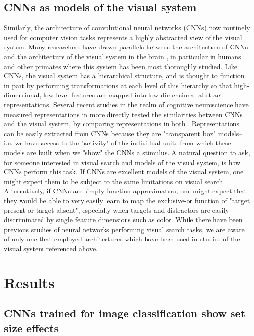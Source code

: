 \documentclass[10pt,letterpaper]{article}
\begin{document}
\subsection{CNNs as models of the visual system}
Similarly, the architecture of convolutional neural networks (CNNs) now routinely used for
computer vision tasks represents a highly abstracted view of the visual system.
Many researchers have drawn parallels between the architecture of CNNs and the 
architecture of the visual system in the brain \cite{kriegeskorteDeepNeuralNetworks2015}, 
in particular in humans and other primates where this system has been most thoroughly 
studied. Like CNNs, the visual system has a hierarchical structure, and is thought to 
function in part by performing transformations at each level of this hierarchy so that 
high-dimensional, low-level features are mapped into low-dimensional abstract 
representations. Several recent studies in the realm of cognitive neuroscience 
have measured representations in more directly tested the similarities between CNNs and 
the visual system, by comparing representations in both 
\cite{khaligh-razaviDeepSupervisedNot2014, yaminsUsingGoaldrivenDeep2016, yaminsPerformanceoptimizedHierarchicalModels2014}. Representations 
can be easily extracted from CNNs because they are "transparent box" models--i.e. we have 
access to the "activity" of the individual units from which these models are built when 
we "show" the CNNs a stimulus.
A natural question to ask, for someone interested in visual search and models of the visual 
system, is how CNNs perform this task. If CNNs are excellent models of the visual system, 
one might expect them to be subject to the same limitations on visual search. Alternatively, 
if CNNs are simply function approximators, one might expect that they would be able to 
very easily learn to map the exclusive-or function of "target present or target absent", 
especially when targets and distractors are easily discriminated by single feature 
dimensions such as color. While there have been previous studies of neural networks 
performing visual search tasks, we are aware of only one that employed architectures 
which have been used in studies of the visual system referenced above.

\section{Results}

\subsection{CNNs trained for image classification show set size effects}
\end{document}
